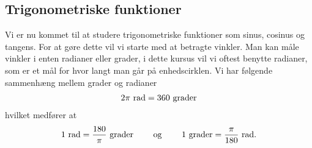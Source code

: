 \subsection{Trigonometriske funktioner}
\noindent Vi er nu kommet til at studere trigonometriske funktioner som sinus, cosinus og tangens. For at gøre dette vil vi starte med at betragte vinkler. Man kan måle vinkler i enten radianer eller grader, i dette kursus vil vi oftest benytte radianer, som er et mål for hvor langt man går på enhedscirklen. Vi har følgende sammenhæng mellem grader og radianer
\begin{align*}
2\pi \textup{ rad} = 360 \textup{ grader}
\end{align*}
hvilket medfører at 
\begin{align*}
1 \textup{ rad} = \frac{180}{\pi} \textup{ grader} \qquad \textup{ og } \qquad 1 \textup{ grader} = \frac{\pi}{180} \textup{ rad}.
\end{align*}
